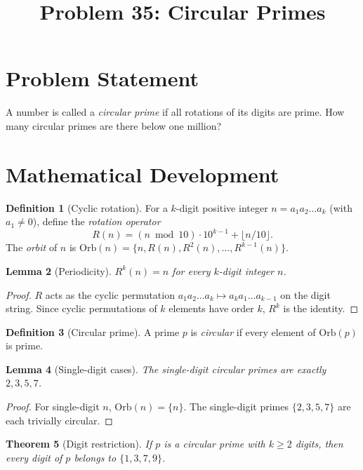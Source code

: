 \documentclass[12pt]{article}
\title{Problem 35: Circular Primes}
\author{}
\date{}
\newtheorem{theorem}{Theorem}
\newtheorem{lemma}[theorem]{Lemma}
\theoremstyle{definition}
\newtheorem{definition}[theorem]{Definition}
\begin{document}
\maketitle

\section{Problem Statement}
A number is called a \emph{circular prime} if all rotations of its digits are prime. How many circular primes are there below one million?

\section{Mathematical Development}

\begin{definition}[Cyclic rotation]
For a $k$-digit positive integer $n = a_1 a_2 \ldots a_k$ (with $a_1 \ne 0$), define the \emph{rotation operator}
\[
R(n) = (n \bmod 10) \cdot 10^{k-1} + \lfloor n/10 \rfloor.
\]
The \emph{orbit} of $n$ is $\mathrm{Orb}(n) = \{n, R(n), R^2(n), \ldots, R^{k-1}(n)\}$.
\end{definition}

\begin{lemma}[Periodicity]
\label{lem:period}
$R^k(n) = n$ for every $k$-digit integer $n$.
\end{lemma}

\begin{proof}
$R$ acts as the cyclic permutation $a_1 a_2 \ldots a_k \mapsto a_k a_1 \ldots a_{k-1}$ on the digit string. Since cyclic permutations of $k$ elements have order $k$, $R^k$ is the identity.
\end{proof}

\begin{definition}[Circular prime]
A prime $p$ is \emph{circular} if every element of $\mathrm{Orb}(p)$ is prime.
\end{definition}

\begin{lemma}[Single-digit cases]
The single-digit circular primes are exactly $2, 3, 5, 7$.
\end{lemma}

\begin{proof}
For single-digit $n$, $\mathrm{Orb}(n) = \{n\}$. The single-digit primes $\{2,3,5,7\}$ are each trivially circular.
\end{proof}

\begin{theorem}[Digit restriction]
\label{thm:digits}
If $p$ is a circular prime with $k \ge 2$ digits, then every digit of $p$ belongs to $\{1, 3, 7, 9\}$.
\end{theorem}
\end{document}
